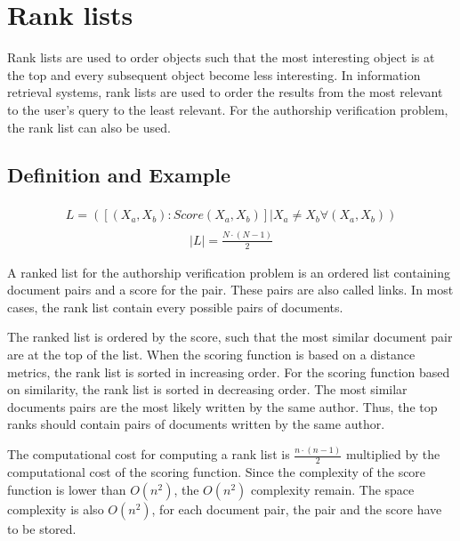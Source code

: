 \section{Rank lists}

Rank lists are used to order objects such that the most interesting object is at the top and every subsequent object become less interesting.
In information retrieval systems, rank lists are used to order the results from the most relevant to the user's query to the least relevant.
For the authorship verification problem, the rank list can also be used.

\subsection{Definition and Example}

\begin{definition}
  \begin{gather*}
      \begin{split}
        L = (\left[(X_a, X_b) : Score(X_a, X_b)\right] | X_a \neq X_b \forall (X_a, X_b))
      \end{split}
  \end{gather*}
  \begin{gather*}
    |L| = \frac{N \cdot (N - 1)}{2}
  \end{gather*}
\end{definition}

A ranked list for the authorship verification problem is an ordered list containing document pairs and a score for the pair.
These pairs are also called links.
In most cases, the rank list contain every possible pairs of documents.

The ranked list is ordered by the score, such that the most similar document pair are at the top of the list.
When the scoring function is based on a distance metrics, the rank list is sorted in increasing order.
For the scoring function based on similarity, the rank list is sorted in decreasing order.
The most similar documents pairs are the most likely written by the same author.
Thus, the top ranks should contain pairs of documents written by the same author.

The computational cost for computing a rank list is $\frac{n \cdot (n - 1)}{2}$ multiplied by the computational cost of the scoring function.
Since the complexity of the score function is lower than $O(n^2)$, the $O(n^2)$ complexity remain.
The space complexity is also $O(n^2)$, for each document pair, the pair and the score have to be stored.

